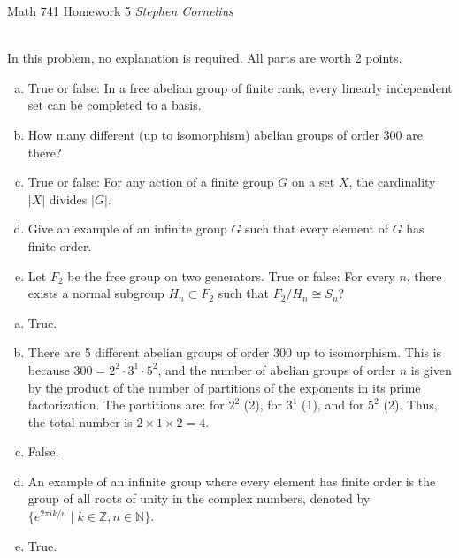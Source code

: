 \documentclass{article}
\begin{document}
\begin{center}
    Math 741
    \hfill Homework 5
    \hfill \textit{Stephen Cornelius}
\end{center}



\begin{problem} \\
    In this problem, no explanation is required. All parts are worth 2 points.
    \begin{enumerate}[(a)]
        \item True or false: In a free abelian group of finite rank, every linearly independent set can be completed to a basis.
        \item How many different (up to isomorphism) abelian groups of order $300$ are there?
        \item True or false: For any action of a finite group $G$ on a set $X$, the cardinality $|X|$ divides $|G|$.
        \item Give an example of an infinite group $G$ such that every element of $G$ has finite order.
        \item Let $F_2$ be the free group on two generators. True or false: For every $n$, there exists a normal subgroup $H_n \subset F_2$ such that $F_2/H_n \cong S_n$?
    \end{enumerate}
\end{problem}

\begin{enumerate}[(a)]
    \item True.
    \item There are 5 different abelian groups of order 300 up to isomorphism. This is because $300 = 2^2 \cdot 3^1 \cdot 5^2$, and the number of abelian groups of order $n$ is given by the product of the number of partitions of the exponents in its prime factorization. The partitions are: for $2^2$ (2), for $3^1$ (1), and for $5^2$ (2). Thus, the total number is $2 \times 1 \times 2 = 4$.
    \item False.
    \item An example of an infinite group where every element has finite order is the group of all roots of unity in the complex numbers, denoted by $\{e^{2\pi i k/n} \mid k \in \mathbb{Z}, n \in \mathbb{N}\}$.
    \item True. %
\end{enumerate}
\end{document}
